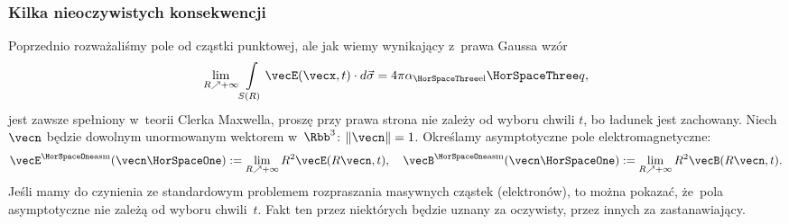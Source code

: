 \documentclass[10pt,t]{beamer}
\begin{document}
\begin{frame}
  \frametitle{Kilka nieoczywistych konsekwencji}


  Poprzednio rozważaliśmy pole od cząstki punktowej, ale jak wiemy
  wynikający z~prawa Gaussa wzór
  \begin{equation}
    \label{eq:Glowne-rodzaje-problemow-podczerwonych-08}
    \lim_{ R \nearrow +\infty } \int\limits_{ S( R ) } \vecE( \vecx, t ) \cdot d\vec{ \sigma } =
    4 \pi \alpha_{ \HorSpaceThree \text{el} } \HorSpaceThree q,
  \end{equation}
  jest zawsze spełniony w~teorii Clerka Maxwella, proszę przy prawa strona
  nie zależy od wyboru chwili $t$, bo ładunek jest zachowany. Niech $\vecn$
  będzie dowolnym unormowanym wektorem w~$\Rbb^{ 3 }$: $\Vert \vecn \Vert = 1$.
  Określamy asymptotyczne pole elektromagnetyczne:
  \begin{equation}
    \label{eq:Glowne-rodzaje-problemow-podczerwonych-09}
    \vecEasm :=
    \lim_{ R \nearrow +\infty } R^{ 2 } \vecE( R \vecn, t ), \quad
    \vecBasm :=
    \lim_{ R \nearrow +\infty } R^{ 2 } \vecB( R \vecn, t ).
  \end{equation}
  Jeśli mamy do czynienia ze standardowym problemem rozpraszania masywnych
  cząstek (elektronów), to można pokazać, że~pola asymptotyczne nie zależą
  od wyboru chwili~$t$. Fakt ten przez niektórych będzie uznany za
  oczywisty, przez innych za zastanawiający.

\end{frame}
\end{document}
